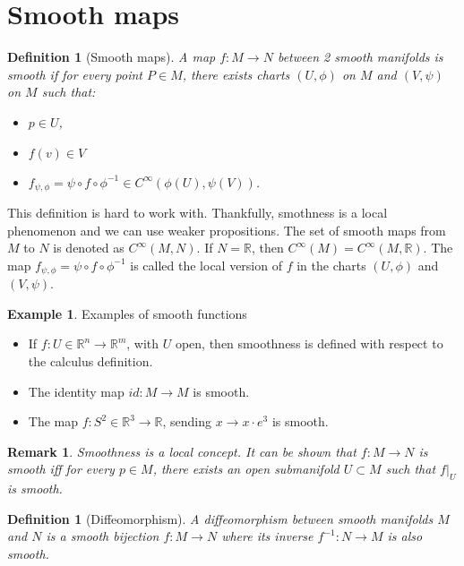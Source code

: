 \documentclass{article}
\newtheorem{definition}[theorem]{Definition}
\newtheorem{remark}[theorem]{Remark}
\theoremstyle{definition}
\newtheorem{example}[theorem]{Example}
\numberwithin{theorem}{section}
\numberwithin{equation}{section}
\begin{document}
\section{Smooth maps}

\begin{definition}[Smooth maps]
	A map $f: M \rightarrow N$ between 2 smooth manifolds is smooth if for every point $P \in M$, there exists charts $(U, \phi)$ on $M$ and $(V, \psi)$ on $M$ such that:
	\begin{itemize}
		\item $p \in U$,
		\item $f(v) \in V$
		\item $f_{\psi, \phi} = \psi \circ f \circ \phi^{-1} \in C^\infty(\phi(U), \psi(V))$. 
	\end{itemize}
\end{definition}
This definition is hard to work with. Thankfully, smothness is a local phenomenon and we can use weaker propositions. The set of smooth maps from $M$ to $N$ is denoted as $C^\infty(M, N)$. 
If $N = \mathbb{R}$, then $C^\infty(M) = C^\infty(M, \mathbb{R})$. The map $f_{\psi, \phi} = \psi \circ f \circ \phi^{-1}$ is called the local version of $f$ in the charts $(U, \phi)$ and $(V, \psi)$. 

\begin{example}
	Examples of smooth functions
	\begin{itemize}
		\item If $f : U \in \mathbb{R}^n \rightarrow \mathbb{R}^m$, with $U$ open, then smoothness is defined with respect to the calculus definition.
		\item The identity map $id : M \rightarrow M$ is smooth. 
		\item The map $f: S^2 \in \mathbb{R}^3 \rightarrow \mathbb{R}$, sending $x \rightarrow x \cdot e^3$ is smooth. 
	\end{itemize}
\end{example}

\begin{remark}
	Smoothness is a local concept. It can be shown that $f: M \rightarrow N$ is smooth iff for every $p \in M$, there exists an open submanifold $U \subset M$ such that $f|_U$ is smooth. 
\end{remark}

\begin{definition}[Diffeomorphism]
	A diffeomorphism between smooth manifolds $M$ and $N$ is a smooth bijection $f : M \rightarrow N$ where its inverse $f^{-1} : N \rightarrow M$ is also smooth. 
\end{definition}
\end{document}
